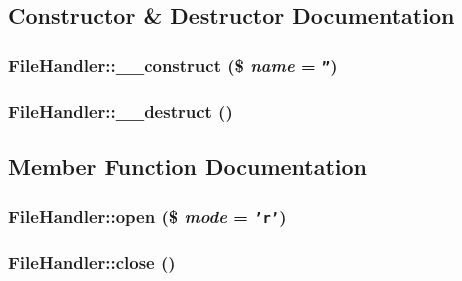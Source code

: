 \subsection{Constructor \& Destructor Documentation}
\hypertarget{classFileHandler_fe961e704bc637605512d72e6eb2ef82}{
\subsubsection{\setlength{\rightskip}{0pt plus 5cm}FileHandler::\_\-\_\-construct (\$ {\em name} = {\tt ''})}}
\label{classFileHandler_fe961e704bc637605512d72e6eb2ef82}


\hypertarget{classFileHandler_734859e8962992da99dd8f853da5ae43}{
\subsubsection{\setlength{\rightskip}{0pt plus 5cm}FileHandler::\_\-\_\-destruct ()}}
\label{classFileHandler_734859e8962992da99dd8f853da5ae43}




\subsection{Member Function Documentation}
\hypertarget{classFileHandler_2a650b033c4eb1f98ba47fb05ce7b454}{
\subsubsection{\setlength{\rightskip}{0pt plus 5cm}FileHandler::open (\$ {\em mode} = {\tt 'r'})}}
\label{classFileHandler_2a650b033c4eb1f98ba47fb05ce7b454}


\hypertarget{classFileHandler_a48e7c3b67346e29b194d2f0ac5dd1f8}{
\subsubsection{\setlength{\rightskip}{0pt plus 5cm}FileHandler::close ()}}
\label{classFileHandler_a48e7c3b67346e29b194d2f0ac5dd1f8}


